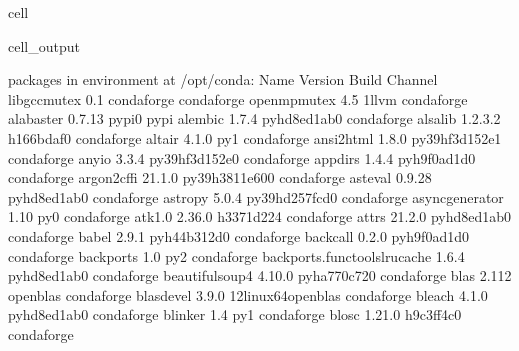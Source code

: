 \documentclass[letterpaper,table,10pt,english]{jupyterBook}
\begin{document}
\begin{sphinxuseclass}{cell}
\begin{sphinxVerbatimOutput}
\begin{sphinxuseclass}{cell_output}
\begin{sphinxVerbatim}[commandchars=\\\{\}]
\PYGZsh{} packages in environment at /opt/conda:
\PYGZsh{}
\PYGZsh{} Name                    Version                   Build  Channel
\PYGZus{}libgcc\PYGZus{}mutex             0.1                 conda\PYGZus{}forge    conda\PYGZhy{}forge
\PYGZus{}openmp\PYGZus{}mutex             4.5                      1\PYGZus{}llvm    conda\PYGZhy{}forge
alabaster                 0.7.13                   pypi\PYGZus{}0    pypi
alembic                   1.7.4              pyhd8ed1ab\PYGZus{}0    conda\PYGZhy{}forge
alsa\PYGZhy{}lib                  1.2.3.2              h166bdaf\PYGZus{}0    conda\PYGZhy{}forge
altair                    4.1.0                      py\PYGZus{}1    conda\PYGZhy{}forge
ansi2html                 1.8.0            py39hf3d152e\PYGZus{}1    conda\PYGZhy{}forge
anyio                     3.3.4            py39hf3d152e\PYGZus{}0    conda\PYGZhy{}forge
appdirs                   1.4.4              pyh9f0ad1d\PYGZus{}0    conda\PYGZhy{}forge
argon2\PYGZhy{}cffi               21.1.0           py39h3811e60\PYGZus{}0    conda\PYGZhy{}forge
asteval                   0.9.28             pyhd8ed1ab\PYGZus{}0    conda\PYGZhy{}forge
astropy                   5.0.4            py39hd257fcd\PYGZus{}0    conda\PYGZhy{}forge
async\PYGZus{}generator           1.10                       py\PYGZus{}0    conda\PYGZhy{}forge
atk\PYGZhy{}1.0                   2.36.0               h3371d22\PYGZus{}4    conda\PYGZhy{}forge
attrs                     21.2.0             pyhd8ed1ab\PYGZus{}0    conda\PYGZhy{}forge
babel                     2.9.1              pyh44b312d\PYGZus{}0    conda\PYGZhy{}forge
backcall                  0.2.0              pyh9f0ad1d\PYGZus{}0    conda\PYGZhy{}forge
backports                 1.0                        py\PYGZus{}2    conda\PYGZhy{}forge
backports.functools\PYGZus{}lru\PYGZus{}cache 1.6.4              pyhd8ed1ab\PYGZus{}0    conda\PYGZhy{}forge
beautifulsoup4            4.10.0             pyha770c72\PYGZus{}0    conda\PYGZhy{}forge
blas                      2.112                  openblas    conda\PYGZhy{}forge
blas\PYGZhy{}devel                3.9.0           12\PYGZus{}linux64\PYGZus{}openblas    conda\PYGZhy{}forge
bleach                    4.1.0              pyhd8ed1ab\PYGZus{}0    conda\PYGZhy{}forge
blinker                   1.4                        py\PYGZus{}1    conda\PYGZhy{}forge
blosc                     1.21.0               h9c3ff4c\PYGZus{}0    conda\PYGZhy{}forge

\end{sphinxVerbatim}
\end{sphinxuseclass}
\end{sphinxVerbatimOutput}
\end{sphinxuseclass}
\end{document}

